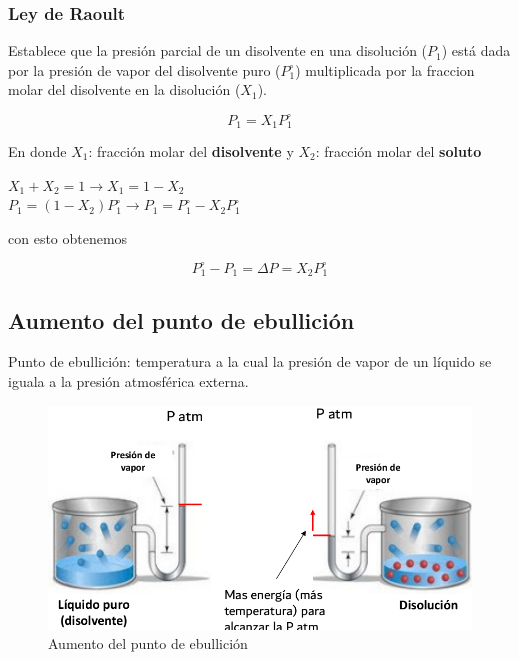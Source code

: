\documentclass[]{article}
\begin{document}
\subsubsection{Ley de Raoult}
Establece que la presión parcial de un disolvente en una disolución ($P_{1}$) está dada por la presión de vapor del disolvente puro ($P_{1}^{\circ}$) multiplicada por la fraccion molar del disolvente en la disolución ($X_{1}$).

\begin{equation}
P_{1}=X_{1}P_{1}^{\circ}
\end{equation}

En donde $X_{1}$: fracción molar del \textbf{disolvente} y $X_{2}$: fracción molar del \textbf{soluto} 

\begin{center}
	$X_{1}+X_{2}=1 \rightarrow X_{1}=1-X_{2}$ \\
	$P_{1}=(1-X_{2})P_{1}^{\circ} \rightarrow P_{1}=P_{1}^{\circ} - X_{2}P_{1}^{\circ}$
\end{center}

con esto obtenemos

\begin{equation}
P_{1}^{\circ}-P_{1}=\Delta P= X_{2}P_{1}^{\circ}
\end{equation}



\subsection{Aumento del punto de ebullición}
Punto de ebullición: temperatura a la cual la presión de vapor de un líquido se iguala a la presión atmosférica externa.

\begin{figure}[H]
\center
\includegraphics[scale=0.33]{foto18.png}
\caption{Aumento del punto de ebullición}
\end{figure}
\end{document}
